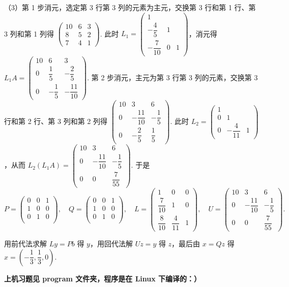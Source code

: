 \documentclass[UTF8]{ctexart}
\begin{document}
（3）第 1 步消元，选定第 3 行第 3 列的元素为主元，交换第 3 行和第 1 行、第 3 列和第 1 列得 $\begin{pmatrix}
    10 & 6 & 3 \\
    8 & 5 & 2 \\
    7 & 4 & 1
\end{pmatrix}$. 此时 $L_1=\begin{pmatrix}
    1 \\
    -\dfrac45 & 1 \\
    -\dfrac7{10} & 0 & 1
\end{pmatrix}$，消元得 $L_1A=\begin{pmatrix}
    10 & 6 & 3\\
    0 & \dfrac15 & -\dfrac25 \\
    0 & -\dfrac15 & -\dfrac{11}{10}
\end{pmatrix}$. 第 2 步消元，主元为第 3 行第 3 列的元素，交换第 3 行和第 2 行、第 3 列和第 2 列得 $\begin{pmatrix}
    10 & 3 & 6 \\
    0 & -\dfrac{11}{10} & -\dfrac15 \\
    0 & -\dfrac25 & \dfrac15
\end{pmatrix}$. 此时 $L_2=\begin{pmatrix}
    1 \\
    0 & 1 \\
    0 & -\dfrac{4}{11} & 1
\end{pmatrix}$，从而 $L_2(L_1A)=\begin{pmatrix}
    10 & 3 & 6\\
    0 & -\dfrac{11}{10} & -\dfrac15 \\
    0 & 0 & \dfrac{7}{55}
\end{pmatrix}$. 于是
\[P=\begin{pmatrix}
    0 & 0 & 1 \\
    1 & 0 & 0 \\
    0 & 1 & 0 \\
\end{pmatrix},\quad Q=\begin{pmatrix}
    0 & 0 & 1 \\
    1 & 0 & 0 \\
    0 & 1 & 0 \\
\end{pmatrix},\quad L=\begin{pmatrix}
    1 & 0 & 0 \\
    \dfrac7{10} & 1 & 0 \\
    \dfrac{8}{10} & \dfrac{4}{11} & 1
\end{pmatrix},\quad U=\begin{pmatrix}
    10 & 3 & 6\\
    0 & -\dfrac{11}{10} & -\dfrac15 \\
    0 & 0 & \dfrac{7}{55}
\end{pmatrix}.\]

用前代法求解 $Ly=Pb$ 得 $y$，用回代法解 $Uz=y$ 得 $z$，最后由 $x=Qz$ 得 $x=\left(-\dfrac13,\dfrac13,0\right)$.

\quad

\quad

\textbf{上机习题见 program 文件夹，程序是在 Linux 下编译的：）}
\end{document}
